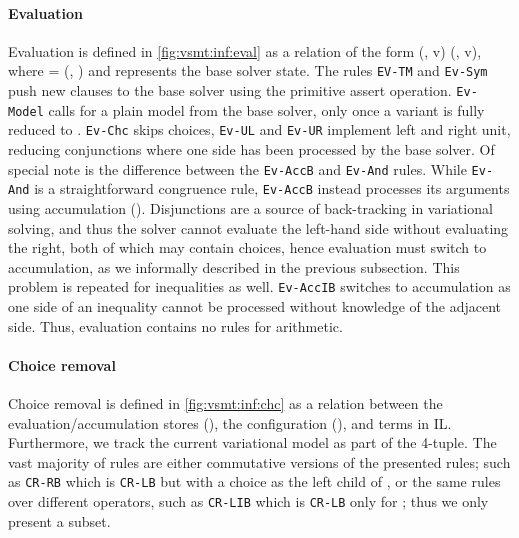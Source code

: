 
\paragraph{Evaluation}
%
Evaluation is defined in \autoref{fig:vsmt:inf:eval} as a relation of the form
(\aeStore{}, v) \evaluation{} (\aeStore{}, v), where \aeStore{} = (\eStore{},
\aStore{}) and \eStore{} represents the base solver state. The rules
\texttt{EV-TM} and \texttt{Ev-Sym} push new clauses to the base solver using the
primitive assert operation. \texttt{Ev-Model} calls for a plain model from the
base solver, only once a variant is fully reduced to \unit{}. \texttt{Ev-Chc}
skips choices, \texttt{Ev-UL} and \texttt{Ev-UR} implement left and right unit,
reducing conjunctions where one side has been processed by the base solver. Of
special note is the difference between the \texttt{Ev-AccB} and \texttt{Ev-And}
rules. While \texttt{Ev-And} is a straightforward congruence rule,
\texttt{Ev-AccB} instead processes its arguments using accumulation
(\accumulation{}). Disjunctions are a source of back-tracking in variational
solving, and thus the solver cannot evaluate the left-hand side without
evaluating the right, both of which may contain choices, hence evaluation must
switch to accumulation, as we informally described in the previous subsection.
This problem is repeated for inequalities as well. \texttt{Ev-AccIB} switches to
accumulation as one side of an inequality cannot be processed without knowledge
of the adjacent side. Thus, evaluation contains no rules for arithmetic.



\paragraph{Choice removal}
Choice removal is defined in \autoref{fig:vsmt:inf:chc} as a relation between
the evaluation/accumulation stores (\aeStore{}), the configuration
(\configuration{}), and terms in IL\@. Furthermore, we track the current
variational model as part of the 4-tuple. The vast majority of rules are either
commutative versions of the presented rules; such as \texttt{CR-RB} which is
\texttt{CR-LB} but with a choice as the left child of \boolFuncs{}, or the same
rules over different operators, such as \texttt{CR-LIB} which is \texttt{CR-LB}
only for \inequalities{}; thus we only present a subset.

